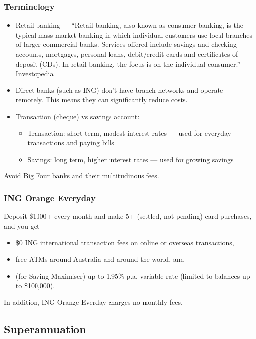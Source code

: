 \subsubsection{Terminology}
\begin{itemize}
	\item Retail banking --- ``Retail banking, also known as consumer banking, is the typical mass-market banking in which individual customers use local branches of larger commercial banks. Services offered include savings and checking accounts, mortgages, personal loans, debit/credit cards and certificates of deposit (CDs). In retail banking, the focus is on the individual consumer.'' --- Investopedia \cite{investopedia_retail_banking}
	\item Direct banks (such as ING) don't have branch networks and operate remotely. This means they can significantly reduce costs.
	\item Transaction (cheque) vs savings account:
	\begin{itemize}
		\item Transaction: short term, modest interest rates --- used for everyday transactions and paying bills
		\item Savings: long term, higher interest rates --- used for growing savings
	\end{itemize}
\end{itemize}

Avoid Big Four banks and their multitudinous fees.

\subsubsection{ING Orange Everyday}
Deposit \$1000+ every month and make 5+ (settled, not pending) card purchases, and you get
\begin{itemize}
	\item \$0 ING international transaction fees on online or overseas transactions,
	\item free ATMs around Australia and around the world, and
	\item (for Saving Maximiser) up to 1.95\% p.a. variable rate (limited to balances up to \$100,000).
\end{itemize}

In addition, ING Orange Everday charges no monthly fees.

\subsection{Superannuation}

